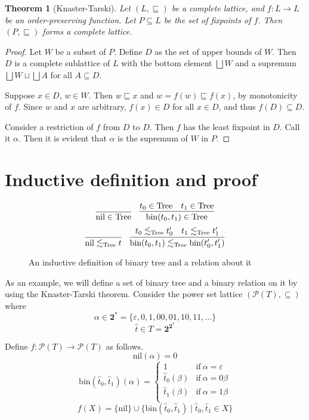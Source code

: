 \documentclass{article}
\newtheorem{theorem}{Theorem}[section]
\newcommand\pow[1]{\mathcal{P}(#1)}
\newcommand\two[0]{\mathbf{2}}
\newcommand\Tree[0]{\text{Tree}}
\newcommand\nil[0]{\text{nil}}
\newcommand\bin[0]{\text{bin}}
\begin{document}
  \begin{theorem}[Knaster-Tarski]
    Let $(L,\sqsubseteq)$ be a complete lattice, and $f : L \to L$ be an order-preserving function. Let $P \subseteq L$ be the set of fixpoints of $f$. Then $(P, \sqsubseteq)$ forms a complete lattice.
  \end{theorem}
  \begin{proof}
    Let $W$ be a subset of $P$.
    Define $D$ as the set of upper bounds of $W$.
    Then $D$ is a complete sublattice of $L$ with the bottom element $\bigsqcup W$ and
    a supremum $\bigsqcup W \sqcup \bigsqcup A$ for all $A \subseteq D$.

    Suppose $x \in D$, $w \in W$.
    Then $w \sqsubseteq x$ and $w = f(w) \sqsubseteq f(x)$, by monotonicity of $f$.
    Since $w$ and $x$ are arbitrary, $f(x) \in D$ for all $x \in D$, and thus $f(D) \subseteq D$.

    Consider a restriction of $f$ from $D$ to $D$.
    Then $f$ has the least fixpoint in $D$. Call it $\alpha$.
    Then it is evident that $\alpha$ is the supremum of $W$ in $P$.
  \end{proof}

\section{Inductive definition and proof}
  \begin{figure}
  \[
    \infer
    {\nil \in \Tree}
    { }
    \quad
    \infer
    {\bin(t_0,t_1) \in \Tree}
    {t_0 \in \Tree & t_1 \in \Tree}
  \]
  \[
    \infer
    {\nil \lesssim_{\Tree} t}
    {}
    \quad
    \infer
    {\bin(t_0,t_1) \lesssim_{\Tree} \bin(t_0',t_1')}
    {t_0 \lesssim_{\Tree} t_0' & t_1 \lesssim_{\Tree} t_1'}
  \]
  \caption{An inductive definition of binary tree and a relation about it}
  \end{figure}

  As an example, we will define a set of binary tree and a binary relation on it by using the Knaster-Tarski theorem.
  Consider the power set lattice $(\pow{T}, \subseteq)$ where
  $$\alpha \in \two^* = \{\varepsilon, 0, 1, 00, 01, 10, 11, ...\}$$
  $$\hat t \in T = \two^{\two^*}$$

  Define $f : \pow{T} \to \pow{T}$ as follows.
  $$ \nil(\alpha) = 0 $$
  $$\bin(\hat t_0, \hat t_1)(\alpha) = \begin{cases}
    1               & \text{if} \ \alpha = \varepsilon \\
    \hat t_0(\beta) & \text{if} \ \alpha = 0\beta \\
    \hat t_1(\beta) & \text{if} \ \alpha = 1\beta \\
    \end{cases}
  $$
  $$ f(X) = \{\nil\} \cup \{\bin(\hat t_0,\hat t_1) \mid \hat t_0, \hat t_1 \in X\} $$
\end{document}
